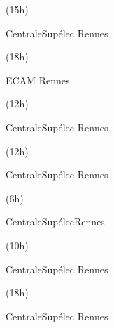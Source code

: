 \documentclass[11pt,a4paper,sans]{moderncv}
\newif\ifportuguese
\newif\iffrench
\newif\ifenglish
\newcommand\ml[3]{\ifenglish    {#1}\fi
  \ifportuguese {#2}\fi
  \iffrench     {#3}\fi}
\begin{document}
{
  \ml
  {Tutoring}
  {Laboratório Automatique 2A}
  {TP Commande Prédictive pour bâtiment intelligent 2A}  (15h)}
{\newline CentraleSupélec}
{Rennes}
{\france}
{}

{
  \ml
  {Tutoring}
  {Laboratório Automatique 2A}
  {TP Asservissements 2A} (18h)}
{\newline ECAM}
{Rennes}
{\france}
{}

{
  \ml
  {Tutoring}
  {Laboratório Automatique 2A}
  {TP Commande Prédictive 3A} (12h)}
{\newline CentraleSupélec}
{Rennes}
{\france}
{}

{
  \ml
  {Tutoring}
  {Laboratório Automatique 2A}
  {TP Commande Prédictive 3A} (12h)}
{\newline CentraleSupélec}
{Rennes}
{\france}
{}

{\ml
  {Tutoring}
  {Laboratório Automatique 2A}
  {TP Automatique 2A}
(6h)}
{\newline CentraleSupélec}{Rennes}{\france}{}

{
  \ml
  {Tutoring}
  {Laboratório Automatique 2A}
  {Projet Optimisation pour Microgrid isolé} (10h)}
{\newline CentraleSupélec}
{Rennes}
{\france}
{}

{
  \ml
  {Tutoring}
  {Laboratório Automatique 2A}
  {TP Automatique 2A} (18h)}
{\newline CentraleSupélec}
{Rennes}
{\france}
{}
\end{document}
